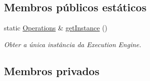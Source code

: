 \subsection*{Membros públicos estáticos}
\begin{DoxyCompactItemize}
\item 
static \hyperlink{classOperations}{Operations} \& \hyperlink{classOperations_afd99f64338fb7f1d1b813254f005bf9a}{get\+Instance} ()
\begin{DoxyCompactList}\small\item\em Obter a única instância da Execution Engine. \end{DoxyCompactList}\end{DoxyCompactItemize}
\subsection*{Membros privados}
